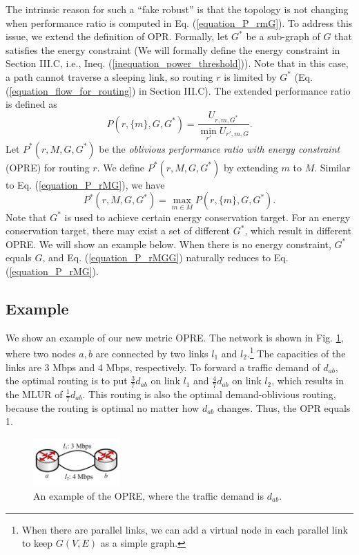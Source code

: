 \documentclass[conference]{IEEEtran}
\begin{document}
The intrinsic reason for such a ``fake robust'' is that the topology is not changing when performance ratio is computed in Eq. (\ref{equation_P_rmG}). To address this issue, we extend the definition of OPR. Formally, let $G^*$ be a sub-graph of $G$ that satisfies the energy constraint (We will formally define the energy constraint in Section III.C, i.e., Ineq. (\ref{inequation_power_threshold})). Note that in this case, a path cannot traverse a sleeping link, so routing $r$ is limited by $G^*$ (Eq. (\ref{equation_flow_for_routing}) in Section III.C). The extended performance ratio is defined as
\begin{equation}
\label{equation_P_rmGG}
	P(r, \{ m \}, G, G^*) = \frac{U_{r,m,G^*}}{\min_{r'} U_{r', m, G}}.
\end{equation}
Let $P^*(r, M, G, G^*)$ be the \emph{oblivious performance ratio with energy constraint} (OPRE) for routing $r$. We define $P^*(r, M, G, G^*)$ by extending $m$ to $M$. Similar to Eq. (\ref{equation_P_rMG}), we have
\begin{equation}
\label{equation_P_rMGG}
	P^*(r, M, G, G^*) = \max_{m\in M} P(r, \{ m \}, G, G^*).
\end{equation}
Note that $G^*$ is used to achieve certain energy conservation target. For an energy conservation target, there may exist a set of different $G^*$, which result in different OPRE. We will show an example below. When there is no energy constraint, $G^*$ equals $G$, and Eq. (\ref{equation_P_rMGG}) naturally reduces to Eq. (\ref{equation_P_rMG}).

\subsection{Example}

We show an example of our new metric OPRE. The network is shown in Fig. \ref{figure_an_example_of_opre}, where two nodes $a, b$ are connected by two links $l_1$ and $l_2$.{\footnote{When there are parallel links, we can add a virtual node in each parallel link to keep $G(V,E)$ as a simple graph.}} The capacities of the links are 3 Mbps and 4 Mbps, respectively. To forward a traffic demand of $d_{ab}$, the optimal routing is to put $\frac{3}{7}d_{ab}$ on link $l_1$ and $\frac{4}{7}d_{ab}$ on link $l_2$, which results in the MLUR of $\frac{1}{7}d_{ab}$. This routing is also the optimal demand-oblivious routing, because the routing is optimal no matter how $d_{ab}$ changes. Thus, the OPR equals 1.

\begin{figure}[!t]
\centering
\includegraphics[width=1.3in]{3-nodes-example}
\vspace{-0.15in}
\caption{An example of the OPRE, where the traffic demand is $d_{ab}$.}
\label{figure_an_example_of_opre}
\end{figure}
\end{document}

